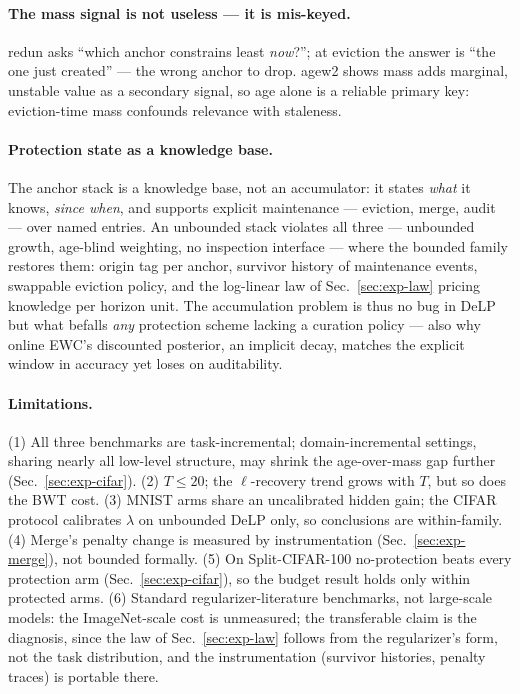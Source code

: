 \documentclass[review,11pt,number]{elsarticle}
\newcommand{\delp}{DeLP}
\begin{document}
\paragraph{The mass signal is not useless --- it is mis-keyed.}
redun asks ``which anchor constrains least \emph{now}?''; at eviction the
answer is ``the one just created'' --- the wrong anchor to drop. agew2 shows
mass adds marginal, unstable value as a secondary signal, so age alone is a
reliable primary key: eviction-time mass confounds relevance with staleness.

\paragraph{Protection state as a knowledge base.}
The anchor stack is a knowledge base, not an accumulator: it states \emph{what}
it knows, \emph{since when}, and supports explicit maintenance --- eviction,
merge, audit --- over named entries. An unbounded stack violates all three ---
unbounded growth, age-blind weighting, no inspection interface --- where the
bounded family restores them: origin tag per anchor, survivor history of
maintenance events, swappable eviction policy, and the log-linear law of
Sec.~\ref{sec:exp-law} pricing knowledge per horizon unit. The accumulation
problem is thus no bug in \delp{} but what befalls \emph{any} protection
scheme lacking a curation policy --- also why online EWC's discounted
posterior, an implicit decay, matches the explicit window in accuracy yet
loses on auditability.

\paragraph{Limitations.}
(1) All three benchmarks are task-incremental; domain-incremental settings,
sharing nearly all low-level structure, may shrink the age-over-mass gap
further (Sec.~\ref{sec:exp-cifar}). (2) $T \le 20$; the $\ell$-recovery trend
grows with $T$, but so does the BWT cost. (3) MNIST arms share an uncalibrated
hidden gain; the CIFAR protocol calibrates $\lambda$ on unbounded \delp{} only,
so conclusions are within-family. (4) Merge's penalty change is measured by
instrumentation (Sec.~\ref{sec:exp-merge}), not bounded formally. (5) On
Split-CIFAR-100 no-protection beats every protection arm
(Sec.~\ref{sec:exp-cifar}), so the budget result holds only within protected
arms. (6) Standard regularizer-literature benchmarks, not large-scale models:
the ImageNet-scale cost is unmeasured; the transferable claim is the diagnosis,
since the law of Sec.~\ref{sec:exp-law} follows from the regularizer's form,
not the task distribution, and the instrumentation (survivor histories, penalty
traces) is portable there.
\end{document}
